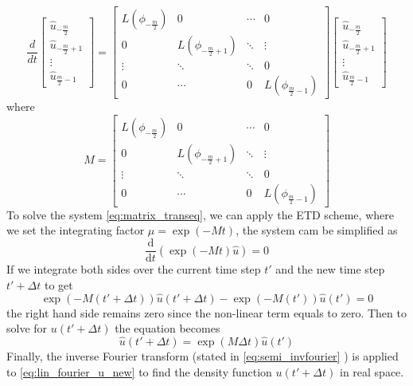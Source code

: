 \documentclass[12pt]{article}
\numberwithin{equation}{section}
\begin{document}
\begin{equation}\label{eq:matrix_transeq}
\frac{d}{dt}\left[\begin{array}{c}
\hat{u}_{-\frac{m}{2}} \\
\hat{u}_{-\frac{m}{2}+1} \\
\vdots \\
\hat{u}_{\frac{m}{2}-1}
\end{array}\right]
=\left[\begin{array}{cccc}
L(\phi_{-\frac{m}{2}}) & 0& \cdots & 0\\
0 & L(\phi_{-\frac{m}{2}+1}) & \ddots&\vdots  \\
\vdots & \ddots & \ddots & 0\\
0  & \cdots & 0& L(\phi_{\frac{m}{2}-1})
\end{array}\right]\left[
\begin{array}{c}
\hat{u}_{-\frac{m}{2}} \\
\hat{u}_{-\frac{m}{2}+1} \\
\vdots \\
\hat{u}_{\frac{m}{2}-1}
\end{array}\right]
\end{equation}
where 
\begin{equation}
M=\left[\begin{array}{cccc}
L\left(\phi_{-\frac{m}{2}}\right) & 0 & \cdots & 0 \\
0 & L\left(\phi_{-\frac{m}{2}+1}\right) & \ddots & \vdots \\
\vdots & \ddots & \ddots & 0 \\
0 & \cdots & 0 & L\left(\phi_{\frac{m}{2}-1}\right)
\end{array}\right]
\end{equation}
To solve the system \eqref{eq:matrix_transeq}, we can apply the ETD scheme, where we set the integrating factor $\mu=\exp(-Mt)$, the system cam be simplified as 
\begin{equation}\label{eq:int_transeq}
\frac{\mathrm{d}}{\mathrm{d} t}(\exp (-M t) \hat{u})=0
\end{equation}
If we integrate both sides over the current time step $t\prime$ and the new time step $t\prime+\Delta t$ to get 
\begin{equation}\label{eq:int_transeq_2}
\exp(-M(t\prime+\Delta t))\hat{u}(t\prime+\Delta t)-\exp(-M(t\prime))\hat{u}(t\prime)=0
\end{equation}
the right hand side remains zero since the non-linear term equals to zero. Then to solve for $u(t\prime+\Delta t)$ the equation becomes
\begin{equation}\label{eq:lin_fourier_u_new}
\hat{u}(t\prime+\Delta t)=\exp(M\Delta t)\hat{u}(t\prime)
\end{equation}
Finally, the inverse Fourier transform (stated in \eqref{eq:semi_invfourier} ) is applied to \eqref{eq:lin_fourier_u_new} to find the density function $u(t\prime+\Delta t)$ in real space. 
\end{document}
